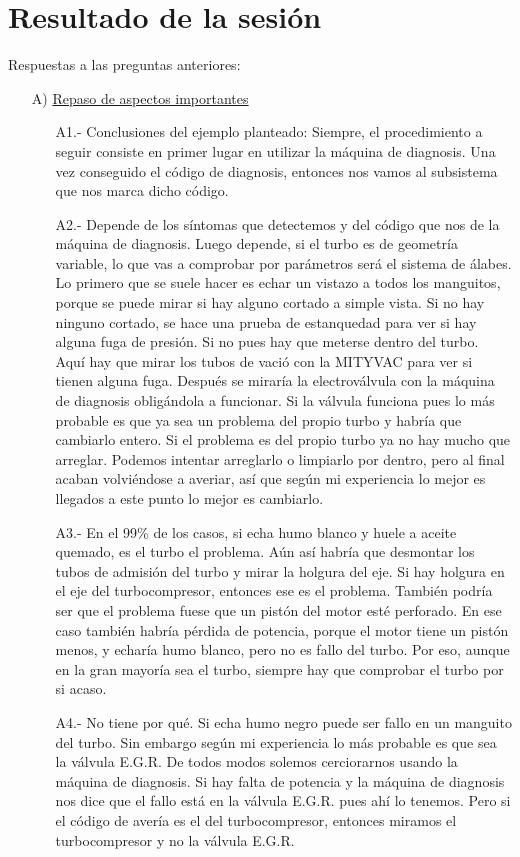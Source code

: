 \documentclass[a4paper,12pt]{article}
\begin{document}
\section{Resultado de la sesión}
Respuestas a las preguntas anteriores:
\begin{itemize}
\item[A)] \underline{Repaso de aspectos importantes}
\begin{itemize}
\item[A1.-] Conclusiones del ejemplo planteado: Siempre, el procedimiento a seguir consiste en primer lugar en utilizar la máquina de diagnosis. Una vez conseguido el código de diagnosis, entonces nos vamos al subsistema que nos marca dicho código.
\item[A2.-] Depende de los síntomas que detectemos y del código que nos de la máquina de diagnosis. Luego depende, si el turbo es de geometría variable, lo que vas a comprobar por parámetros será el sistema de álabes. Lo primero que se suele hacer es echar un vistazo a todos los manguitos, porque se puede mirar si hay alguno cortado a simple vista. Si no hay ninguno cortado, se hace una prueba de estanquedad para ver si hay alguna fuga de presión. Si no pues hay que meterse dentro del turbo. Aquí hay que mirar los tubos de vació con la MITYVAC para ver si tienen alguna fuga. Después se miraría la electroválvula con la máquina de diagnosis obligándola a funcionar. Si la válvula funciona pues lo más probable es que ya sea un problema del propio turbo y habría que cambiarlo entero. Si el problema es del propio turbo ya no hay mucho que arreglar. Podemos intentar arreglarlo o limpiarlo por dentro, pero al final acaban volviéndose a averiar, así que según mi experiencia lo mejor es llegados a este punto lo mejor es cambiarlo.
\item[A3.-] En el 99\% de los casos, si echa humo blanco y huele a aceite quemado, es el turbo el problema. Aún así habría que desmontar los tubos de admisión del turbo y mirar la holgura del eje. Si hay holgura en el eje del turbocompresor, entonces ese es el problema. También podría ser que el problema fuese que un pistón del motor esté perforado. En ese caso también habría pérdida de potencia, porque el motor tiene un pistón menos, y echaría humo blanco, pero no es fallo del turbo. Por eso, aunque en la gran mayoría sea el turbo, siempre hay que comprobar el turbo por si acaso.
\item[A4.-] No tiene por qué.  Si echa humo negro puede ser fallo en un manguito del turbo. Sin embargo según mi experiencia lo más probable es que sea la válvula E.G.R. De todos modos solemos cerciorarnos usando la máquina de diagnosis. Si hay falta de potencia y la máquina de diagnosis nos dice que el fallo está en la válvula E.G.R. pues ahí lo tenemos. Pero si el código de avería es el del turbocompresor, entonces miramos el turbocompresor y no la válvula E.G.R.

\end{itemize}
\end{itemize}
\end{document}
